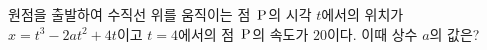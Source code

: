 원점을 출발하여 수직선 위를 움직이는 점~$\mathrm{P}$의 시각 $t$에서의 위치가 $x=t^3-2at^2+4t$이고 $t=4$에서의 점~$\mathrm{P}$의 속도가 $20$이다. 이때 상수 $a$의 값은?
